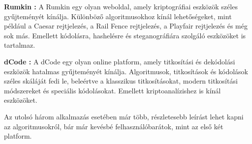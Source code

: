\textbf{Rumkin \cite{Rum}:} A Rumkin egy olyan weboldal, amely kriptográfiai eszközök széles gyűjteményét kínálja. Különböző algoritmusokhoz kínál lehetőségeket, mint például a Caesar rejtjelezés, a Rail Fence rejtjelezés, a Playfair rejtjelezés és még sok más. Emellett kódolásra, hashelésre és steganográfiára szolgáló eszközöket is tartalmaz.

\textbf{dCode \cite{dCo}:} A dCode egy olyan online platform, amely titkosítási és dekódolási eszközök hatalmas gyűjteményét kínálja. Algoritmusok, titkosítások és kódolások széles skáláját fedi le, beleértve a klasszikus titkosításokat, modern titkosítási módszereket és speciális kódolásokat. Emellett kriptoanalízishez is kínál eszközöket.

Az utolsó három alkalmazás esetében már több, részletesebb leírást lehet kapni az algoritmusokról, bár már kevésbé felhasználóbarátok, mint az első két platform.


